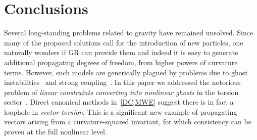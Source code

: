 \documentclass[aps,prd,reprint,preprintnumbers,showpacs,floatfix,nofootinbib,superscript address,longbibliography]{revtex4-1}
\begin{document}
\section{Conclusions} 
Several long-standing problems related to gravity have remained unsolved. Since many of the proposed solutions call for the introduction of new particles, one naturally wonders if GR can provide them and indeed it is easy to generate additional propagating degrees of freedom, \eg from higher powers of curvature terms. However, such models are generically plagued by problems due to ghost instabilities~\cite{Stelle:1977ry,Neville:1978bk,Neville:1979rb,Sezgin:1979zf,Hayashi:1979wj, Hayashi:1980qp} and strong coupling~\cite{Hecht:1996np,Yo:1999ex,Yo:2001sy}. In this paper we addressed the notorious problem of \emph{linear constraints converting into nonlinear ghosts} in the torsion sector~\cite{Yo:2001sy,Hayashi:1980qp,Blagojevic:1983zz,Barker:2021oez,Blagojevic:2013dea,Blagojevic:2013taa,Aoki:2020rae,BeltranJimenez:2019hrm,Hecht:1996np,Yo:1999ex,Yo:2001sy,Hecht:1991jh,Magueijo:2008sx,Afshordi:2006ad,Dimakis:1989az,Dimakis:1989ba,Lemke:1990su,Hecht:1990wn,Delhom:2022vae,Velo:1969txo,Aragone:1971kh,Krasnov:2021zen,Chen:1998ad,Cheng:1988zg,Chen:1998ad,Blixt:2020ekl}. Direct canonical methods in~\cref{DC,MWE} suggest there is in fact a loophole in \emph{vector torsion}. This is a significant new example of propagating vectors arising from a curvature-squared invariant, for which consistency can be proven at the full nonlinear level.
\end{document}
